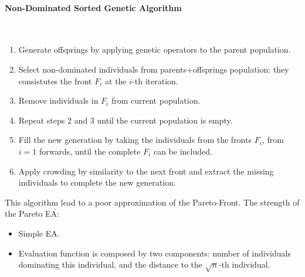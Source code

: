 \documentclass{article}
\begin{document}
\paragraph{Non-Dominated Sorted Genetic Algorithm}\mbox{}\\
\begin{enumerate}
    \item Generate offsprings by applying genetic operators to the parent population.
    \item Select non-dominated individuals from parents+offsprings population: they consistutes
          the front $F_i$ at the $i$-th iteration.
    \item Remove individuals in $F_i$ from current population.
    \item Repeat steps 2 and 3 until the current population is empty.
    \item Fill the new generation by taking the individuals from the fronts $F_i$, from $i=1$ forwards,
          until the complete $F_i$ can be included.
    \item Apply crowding by similarity to the next front and extract the missing individuals to complete the
          new generation.
\end{enumerate}
This algorithm lead to a poor approximation of the Pareto-Front.
\newline\newline
The strength of the Pareto EA:
\begin{itemize}
    \item Simple EA.
    \item Evaluation function is composed by two components: number of individuals dominating
          this individual, and the distance to the $\sqrt{n}$-th individual.
\end{itemize}
\end{document}
